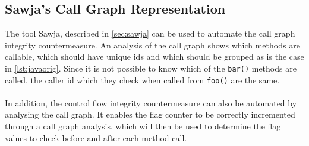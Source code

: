 \subsection{Sawja's Call Graph Representation}
The tool Sawja, described in \cref{sec:sawja} can be used to automate the call graph integrity countermeasure. An analysis of the call graph shows which methods are callable, which should have unique ids and which should be grouped as is the case in \cref{lst:javaorig}. Since it is not possible to know which of the \texttt{bar()} methods are called, the caller id which they check when called from \texttt{foo()} are the same.\\\\
In addition, the control flow integrity countermeasure can also be automated by analysing the call graph. It enables the flag counter to be correctly incremented through a call graph analysis, which will then be used to determine the flag values to check before and after each method call.
